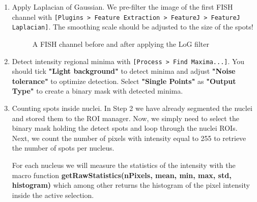 \documentclass[11pt,a4paper,oneside]{report}
\newcommand{\ijmenu}[1]{\texttt{\small#1}}
\begin{document}
\begin{enumerate}
    \item Apply Laplacian of Gaussian. We pre-filter the image of the first FISH channel with \ijmenu{[Plugins > Feature Extraction > FeatureJ >  FeatureJ Laplacian]}. The smoothing scale should be adjusted to the size of the spots! 
    \begin{figure}[htbp]
        \centering
        \quad
        \quad
        \caption{A FISH channel before and after applying the LoG filter}
\end{figure}
    
    \item Detect intensity regional minima with \ijmenu{[Process > Find Maxima...]}. You should tick \textbf{"Light background"} to detect minima and adjust \textbf{"Noise tolerance"} to optimize detection. Select \textbf{"Single Points"} as \textbf{"Output Type"} to create a binary mask with detected minima.
    
    \item Counting spots inside nuclei.
    In Step 2 we have already segmented the nuclei and stored them to the ROI manager. Now, we simply need to select the binary mask holding the detect spots and loop through the nuclei ROIs. Next, we count the number of pixels with intensity equal to 255 to retrieve the number of spots per nucleus.
    
    For each nucleus we will measure the statistics of the intensity with the macro function \textbf{getRawStatistics(nPixels, mean, min, max, std, histogram)} which among other returns the histogram of the pixel intensity inside the active selection. 

\end{enumerate}
\end{document}
